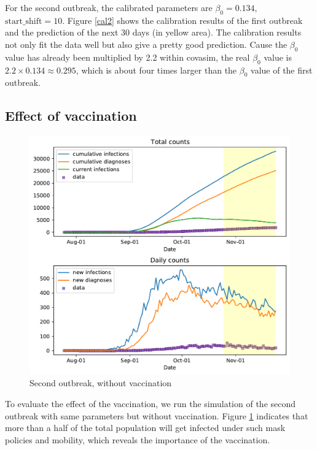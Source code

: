 For the second outbreak, the calibrated parameters are $\beta_0=0.134$, $\text{start\_shift}=10$. Figure \ref{cal2} shows the calibration results of the first outbreak and the prediction of the next 30 days (in yellow area). The calibration results not only fit the data well but also give a pretty good prediction. Cause the $\beta_0$ value has already been multiplied by 2.2 within covasim, the real $\beta_0$ value is $2.2\times 0.134\approx0.295$, which is about four times larger than the $\beta_0$ value of the first outbreak.
\subsection{Effect of vaccination}
\begin{figure}
	\centering
	\includegraphics[width=0.95\linewidth]{result/sg2_zero_predict.pdf}
	\caption{Second outbreak, without vaccination}
	\label{without}
\end{figure}
To evaluate the effect of the vaccination, we run the simulation of the second outbreak with same parameters but without vaccination. Figure \ref{without} indicates that more than a half of the total population will get infected under such mask policies and mobility, which reveals the importance of the vaccination.
